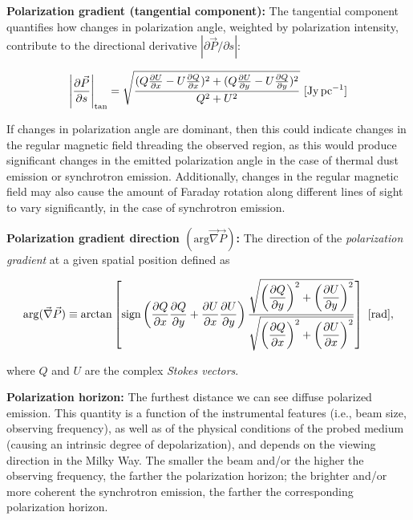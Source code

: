 \documentclass[a4paper,10pt]{article}
\begin{document}
{\noindent}\textbf{Polarization gradient (tangential component):} The tangential component quantifies how changes in polarization angle, weighted by polarization intensity, contribute to the directional derivative $|\partial\vec{P}/\partial s|$:

\begin{align*}
    \left\lvert\frac{\partial\vec{P}}{\partial s}\right\rvert_\mathrm{tan} = \sqrt{\frac{(Q\frac{\partial U}{\partial x} - U\frac{\partial Q}{\partial x})^2 + (Q\frac{\partial U}{\partial y} - U\frac{\partial Q}{\partial y})^2}{Q^2+U^2}} ~ [{\rm Jy\,pc^{-1}}]
\end{align*}

{\noindent}If changes in polarization angle are dominant, then this could indicate changes in the regular magnetic field threading the observed region, as this would produce significant changes in the emitted polarization angle in the case of thermal dust emission or synchrotron emission. Additionally, changes in the regular magnetic field may also cause the amount of Faraday rotation along different lines of sight to vary significantly, in the case of synchrotron emission.

{\noindent}\textbf{Polarization gradient direction $(\mathrm{arg}\vec\nabla\vec{P})$:} The direction of the \textit{polarization gradient} at a given spatial position defined as

\begin{align*}
    \mathrm{arg}(\vec\nabla\vec{P}) \equiv \arctan \left[ \mathrm{sign} \left(\dfrac{\partial Q}{\partial x}\dfrac{\partial Q}{\partial y} + \dfrac{\partial U}{\partial x}\dfrac{\partial U}{\partial y}\right) \dfrac{\sqrt{\left(\dfrac{\partial Q}{\partial y}\right)^2 + \left(\dfrac{\partial U}{\partial y}\right)^2}}{\sqrt{\left(\dfrac{\partial Q}{\partial x}\right)^2 + \left(\dfrac{\partial U}{\partial x}\right)^2}} \right] ~ [{\rm rad}],
\end{align*}

{\noindent}where $Q$ and $U$ are the complex \textit{Stokes vectors}.

{\noindent}\textbf{Polarization horizon:} The furthest distance we can see diffuse polarized emission. This quantity is a function of the instrumental features (i.e., beam size, observing frequency), as well as of the physical conditions of the probed medium (causing an intrinsic degree of depolarization), and depends on the viewing direction in the Milky Way. The smaller the beam and/or the higher the observing frequency, the farther the polarization horizon; the brighter and/or more coherent the synchrotron emission, the farther the corresponding polarization horizon.
\end{document}
